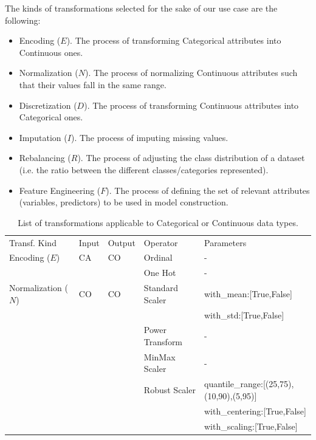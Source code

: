 \begin{example}
The kinds of transformations selected for the sake of our use case are the following:

\begin{itemize}[noitemsep,topsep=0pt]
\item{Encoding ($E$).} The process of transforming Categorical attributes into Continuous ones.
\item{Normalization ($N$).} The process of normalizing Continuous attributes such that their values fall in the same range.
\item{Discretization ($D$).} The process of transforming Continuous attributes into Categorical ones.
\item{Imputation ($I$).} The process of imputing missing values.
\item{Rebalancing ($R$).} The process of adjusting the class distribution of a dataset (i.e. the ratio between the different classes/categories represented).
\item{Feature Engineering ($F$).} The process of defining the set of relevant attributes (variables, predictors) to be used in model construction.

\end{itemize}

\begin{table}[!t]
\renewcommand{\arraystretch}{0.3}
\footnotesize
\caption{List of transformations applicable to Categorical or Continuous data types.}
\centering
\begin{threeparttable}

\begin{tabular}{@{}p{30mm}lll>{\ttfamily}l@{}}
\toprule
Transf. Kind& Input & Output & Operator & \textnormal{Parameters}
\\	\cmidrule[.1em]{1-5}

Encoding ($E$)  & CA & CO & Ordinal & -  \\ \cmidrule[.05em]{4-5} & & & One Hot & - \\
\cmidrule[.1em]{1-5}

Normalization ($N$) & CO & CO & Standard Scaler & with\_mean:[True,False]\\ \cmidrule[.05em]{4-5} & & & & with\_std:[True,False] \\ \cmidrule[.05em]{4-5}
&  &  & Power Transform & -\\ \cmidrule[.05em]{4-5}
&  &  & MinMax Scaler & -\\ \cmidrule[.05em]{4-5}
&  &  & Robust Scaler & quantile\_range:[(25,75),(10,90),(5,95)]\\ \cmidrule[.05em]{4-5} & & & & with\_centering:[True,False]\\ \cmidrule[.05em]{4-5} & & & & with\_scaling:[True,False] \\
\cmidrule[.1em]{1-5}


\end{tabular}
\end{threeparttable}
\end{table}
\end{example}
